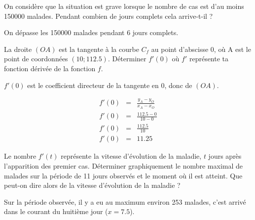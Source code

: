 \begin{questions}
	\question[2] On considère que la situation est grave lorsque le nombre de cas est d'au moins \num{150000} malades. Pendant combien de jours complets cela arrive-t-il ?
	\begin{solution}
		On dépasse les \num{150000} malades pendant 6 jours complets.
	\end{solution}
	
	\question[2] La droite $(OA)$ est la tangente à la courbe $C_f$ au point d'abscisse 0, où A est le point de coordonnées $(10;\num{112.5})$. Déterminer $f'(0)$ où $f'$ représente ta fonction dérivée de la fonction $f$.\label{q:drv}
	\begin{solution}
		$f'(0)$ est le coefficient directeur de la tangente en 0, donc de $(OA)$.
		
		\begin{eqnarray*}
			f'(0) &=& \frac{y_A - y_O}{x_A - x_O} \\
			f'(0) &=& \frac{\num{112.5} - 0}{10 - 0} \\
			f'(0) &=& \frac{\num{112.5}}{10} \\
			f'(0) &=& \num{11.25}
		\end{eqnarray*}
	\end{solution}
	
	\question[2] Le nombre $f'(t)$ représente la vitesse d'évolution de la maladie, $t$ jours après l'apparition des premier cas.
			Déterminer graphiquement le nombre maximal de malades sur la période de 11 jours observés et le moment où il est atteint. Que peut-on dire alors de la vitesse d'évolution de la maladie ?
			\begin{solution}
				Sur la période observée, il y a eu au maximum environ 253 malades, c'est arrivé dans le courant du huitième jour ($x=\num{7.5}$).
			\end{solution}
			
\end{questions}


